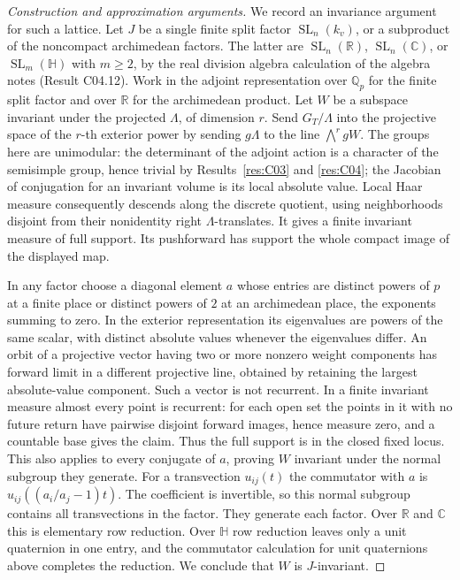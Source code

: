 \documentclass[11pt,a4paper,openany,oneside]{book}
\theoremstyle{resultstyle}
\theoremstyle{definition}
\numberwithin{equation}{chapter}
\begin{document}
\begin{proof}[Construction and approximation arguments]
We record an invariance argument for such a lattice. Let \(J\)
be a single finite split factor \(\operatorname{SL}_n(k_v)\), or
a subproduct of the noncompact archimedean factors. The latter
are \(\operatorname{SL}_n(\mathbb R)\),
\(\operatorname{SL}_n(\mathbb C)\), or
\(\operatorname{SL}_m(\mathbb H)\) with \(m\geq2\), by the real
division algebra calculation of the algebra notes
(Result C04.12). Work in the adjoint representation over
\(\mathbb Q_p\) for the finite split factor and over \(\mathbb R\)
for the archimedean product. Let \(W\) be a subspace invariant
under the projected \(\Lambda\), of dimension \(r\). Send
\(G_T/\Lambda\) into the projective space of the \(r\)-th exterior
power by sending \(g\Lambda\) to the line \(\bigwedge^r gW\).
The groups here are unimodular: the determinant of the adjoint
action is a character of the semisimple group, hence trivial
by Results~\ref{res:C03} and \ref{res:C04}; the Jacobian of
conjugation for an invariant volume is its local absolute value.
Local Haar measure consequently descends along the discrete
quotient, using neighborhoods disjoint from their nonidentity
right \(\Lambda\)-translates. It gives a finite invariant measure
of full support. Its pushforward has support the whole compact
image of the displayed map.

In any factor choose a diagonal element \(a\) whose entries are
distinct powers of \(p\) at a finite place or distinct powers of
\(2\) at an archimedean place, the exponents summing to zero.
In the exterior representation its eigenvalues are powers of
the same scalar, with distinct absolute values whenever the
eigenvalues differ. An orbit of a projective vector having two
or more nonzero weight components has forward limit in a
different projective line, obtained by retaining the largest
absolute-value component. Such a vector is not recurrent. In a
finite invariant measure almost every point is recurrent: for
each open set the points in it with no future return have
pairwise disjoint forward images, hence measure zero, and a
countable base gives the claim. Thus the full support is in the
closed fixed locus. This also applies to every conjugate of
\(a\), proving \(W\) invariant under the normal subgroup they
generate. For a transvection \(u_{ij}(t)\) the commutator with
\(a\) is \(u_{ij}((a_i/a_j-1)t)\). The coefficient is invertible,
so this normal subgroup contains all transvections in the
factor. They generate each factor. Over \(\mathbb R\) and
\(\mathbb C\) this is elementary row reduction. Over \(\mathbb H\)
row reduction leaves only a unit quaternion in one entry, and
the commutator calculation for unit quaternions above completes
the reduction. We conclude that \(W\) is \(J\)-invariant.


\end{proof}
\end{document}
